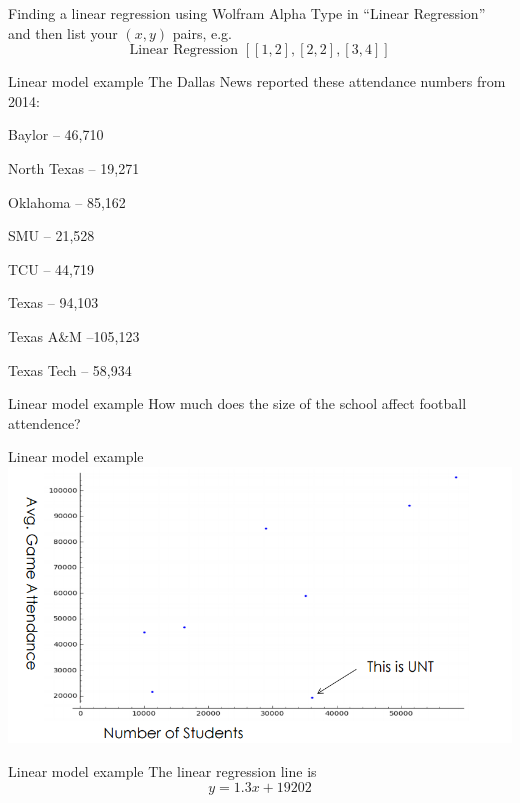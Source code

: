 \documentclass[t]{beamer}
\newenvironment{fpi}
  {\itemize[nolistsep,itemsep=\fill]}
  {\vfill\enditemize}
\begin{document}
\begin{frame}{Finding a linear regression using Wolfram Alpha}
Type in ``Linear Regression'' and then list your $(x,y)$ pairs, e.g.
$$\text{Linear Regression } [[1,2], [2,2],[3,4]]$$
\end{frame}


\begin{frame}{Linear model example}
The Dallas News reported these attendance
numbers from 2014:
\begin{fpi}
\item Baylor – 46,710
\item North Texas – 19,271
\item  Oklahoma – 85,162
\item  SMU – 21,528
\item  TCU – 44,719
\item  Texas – 94,103
\item  Texas A\&M –105,123
\item  Texas Tech – 58,934
\end{fpi}
\end{frame}

\begin{frame}{Linear model example}
\vfill
 How much does the size of the school affect football attendence?  
\vfill
\end{frame}

\begin{frame}{Linear model example}
\vfill
\includegraphics[width=\textwidth]{football}
\vfill
\end{frame}

\begin{frame}{Linear model example}
The linear regression line is
$$y = 1.3x + 19202$$
\end{frame}
\end{document}
